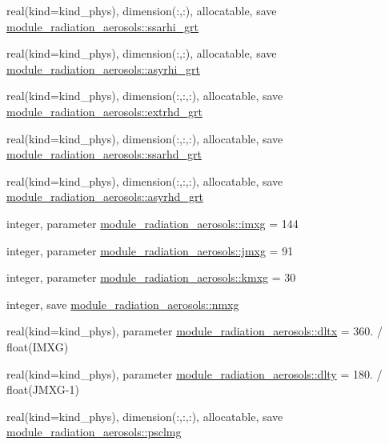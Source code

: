 \begin{DoxyCompactItemize}
\item 
real(kind=kind\+\_\+phys), dimension(\+:,\+:), allocatable, save \hyperlink{group__module__radiation__aerosols_gae8587d9b4ebd9cf5d363a82d15049324}{module\+\_\+radiation\+\_\+aerosols\+::ssarhi\+\_\+grt}
\item 
real(kind=kind\+\_\+phys), dimension(\+:,\+:), allocatable, save \hyperlink{group__module__radiation__aerosols_ga4b5f80817af9f2116618d6c8f0e194de}{module\+\_\+radiation\+\_\+aerosols\+::asyrhi\+\_\+grt}
\item 
real(kind=kind\+\_\+phys), dimension(\+:,\+:,\+:), allocatable, save \hyperlink{group__module__radiation__aerosols_ga07bfe1ada075519d1d3ceabe21b65a96}{module\+\_\+radiation\+\_\+aerosols\+::extrhd\+\_\+grt}
\item 
real(kind=kind\+\_\+phys), dimension(\+:,\+:,\+:), allocatable, save \hyperlink{group__module__radiation__aerosols_ga4aa91ab1d0b9d71c704dc565ef4704bf}{module\+\_\+radiation\+\_\+aerosols\+::ssarhd\+\_\+grt}
\item 
real(kind=kind\+\_\+phys), dimension(\+:,\+:,\+:), allocatable, save \hyperlink{group__module__radiation__aerosols_ga2da45b8bd425415ca417f6590cc54da6}{module\+\_\+radiation\+\_\+aerosols\+::asyrhd\+\_\+grt}
\item 
integer, parameter \hyperlink{group__module__radiation__aerosols_gaa7b2e0e1d0669af4efc75cb32301f1f1}{module\+\_\+radiation\+\_\+aerosols\+::imxg} = 144
\item 
integer, parameter \hyperlink{group__module__radiation__aerosols_ga816ee06781e63adf8752a9a67ab2da2d}{module\+\_\+radiation\+\_\+aerosols\+::jmxg} = 91
\item 
integer, parameter \hyperlink{group__module__radiation__aerosols_ga5339e589d92fab8cbb310b84b6ca3d9e}{module\+\_\+radiation\+\_\+aerosols\+::kmxg} = 30
\item 
integer, save \hyperlink{group__module__radiation__aerosols_gadb4c4cdc8e3212777229d1f54e79bb05}{module\+\_\+radiation\+\_\+aerosols\+::nmxg}
\item 
real(kind=kind\+\_\+phys), parameter \hyperlink{group__module__radiation__aerosols_ga084315fde4afcad23cd3aeb18a4d8a4e}{module\+\_\+radiation\+\_\+aerosols\+::dltx} = 360. / float(I\+M\+XG)
\item 
real(kind=kind\+\_\+phys), parameter \hyperlink{group__module__radiation__aerosols_ga499bb3c75e9802c5ee7fd6cdb6660f7e}{module\+\_\+radiation\+\_\+aerosols\+::dlty} = 180. / float(J\+M\+XG-\/1)
\item 
real(kind=kind\+\_\+phys), dimension(\+:,\+:,\+:), allocatable, save \hyperlink{group__module__radiation__aerosols_ga942aa3a9f61cb40592bd0879a91c2ede}{module\+\_\+radiation\+\_\+aerosols\+::psclmg}

\end{DoxyCompactItemize}
